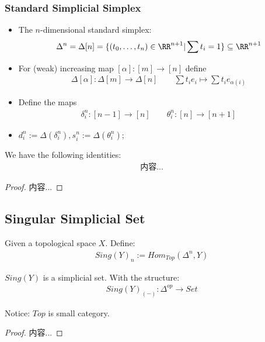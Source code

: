 \documentclass[Total.tex]{subfiles}
\begin{document}
		\subsubsection{Standard Simplicial Simplex}
		\begin{Def}
			\begin{itemize}
				\item 
				The $n$-dimensional standard simplex:
				\begin{gather*}
					\Delta^n=\Delta[n]=\{(t_0,\dots,t_{n})\in \RR^{n+1}|\sum t_i=1\}\subseteq \RR^{n+1}
				\end{gather*}
				\item For (weak) increasing map $[\alpha]:[m]\rightarrow [n]$ define
				\begin{gather*}
					\Delta[\alpha]:\Delta[m]\rightarrow \Delta[n]\qquad \sum t_i e_i\mapsto \sum t_i e_{\alpha(i)}
				\end{gather*}
				\item Define the maps
				\begin{gather*}
					\delta^{n}_i:[n-1]\rightarrow [n]\qquad \theta^n_i:[n]\rightarrow [n+1]
				\end{gather*}
				
				\item $d^n_i:=\Delta(\delta^n_i),s^n_i:=\Delta(\theta^n_i)$;
			\end{itemize}
		\end{Def}
		
		\begin{proposition}
			We have the following identities:
			\begin{gather*}
				内容...
			\end{gather*}
		\end{proposition}
		\begin{proof}
			内容...
		\end{proof}
		\subsection{Singular Simplicial Set}
			\begin{Def}
				Given a topological space $X$. Define:
				\begin{gather*}
					Sing(Y)_n:=Hom_{Top}(\Delta^n,Y)
				\end{gather*}
			\end{Def}
			
			\begin{proposition}
				$Sing(Y)$ is a simplicial set. With the structure:
				\begin{gather*}
					Sing(Y)_{(-)}:\Delta^{op}\rightarrow Set
				\end{gather*}
				
				Notice: $Top$ is small category.
			\end{proposition}
			\begin{proof}
				内容...
			\end{proof}
			
\end{document}
